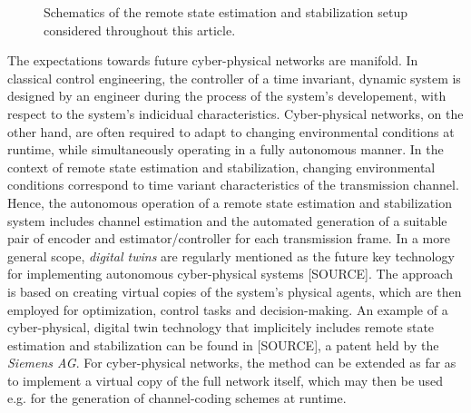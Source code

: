 \documentclass[conference]{IEEEtran}
\newcommand{\rys}{(\mathsf{y}_t)_{t\in\NN}}
\newcommand{\rvs}{(\mathsf{v}_t)_{t\in\NN}}
\newcommand{\rshs}{(\hat{\mathsf{s}}_t)_{t\in\NN}}
\def\D{{\mathcal D}}
\def\NN{{\mathbb N}}
\newcommand{\De}{\D_{\text{Est}}}
\newcommand{\Dc}{\D_{\text{Ctrl}}}
\newcommand{\sdummy}{{\color{red}[SOURCE]}}
\begin{document}
\begin{figure}
		\caption{Schematics of the remote state estimation and stabilization setup considered throughout this article.}
		\label{fig:Schematics}
	\end{figure}     
	
	The expectations towards future cyber-physical networks are manifold. In classical control engineering,
	the controller of a time invariant, dynamic system is designed by an engineer during the process of the system's developement, with respect to the system's indicidual characteristics.
	Cyber-physical networks, on the other hand, are often required to adapt to changing environmental conditions at runtime, while simultaneously operating in a fully autonomous manner.
	In the context of remote state estimation and stabilization, changing environmental conditions correspond to time variant characteristics of the transmission channel.
	Hence, the autonomous operation of a remote state estimation and stabilization system includes channel estimation and the automated generation of a suitable pair of encoder and estimator/controller
	for each transmission frame. In a more general scope, \emph{digital twins} are regularly mentioned as the future key technology for implementing autonomous cyber-physical systems \sdummy.
	The approach is based on creating virtual copies of the system's physical agents, which are then employed for optimization, control tasks and decision-making. 
	An example of a cyber-physical, digital twin technology that implicitely includes remote state estimation and stabilization 
	can be found in \sdummy, a patent held by the \emph{Siemens AG}. For cyber-physical networks, the method can be extended as far as to implement a virtual copy of the full network itself, 
	which may then be used e.g. for the generation of channel-coding schemes at runtime.
	
\end{document}
